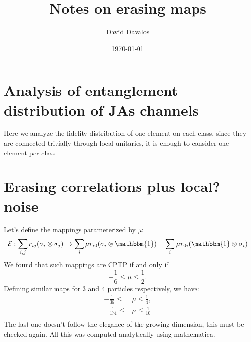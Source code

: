 \documentclass[letterpaper,12pt]{article} %
\author{David Davalos}
\date{\today}
\title{Notes on erasing maps}
\newcommand{\one}{\mathbbm{1}}
\newcommand{\<}{\langle}
\newcommand{\mcE}{\mathcal{E}}
\begin{document}
 
\maketitle
\tableofcontents
\section{Analysis of entanglement distribution of JAs channels}
Here we analyze the fidelity distribution of one element on each class, since they are connected trivially through local unitaries, it is enough to consider  one element per class.
\section{Erasing correlations plus local? noise}
Let's define the mappings parameterized by $\mu$:
\begin{equation}
\mcE:\sum_{i,j} r_{ij} (\sigma_i \otimes \sigma_j) \mapsto \sum_{i} \mu r_{i0} (\sigma_i\otimes \one) +\sum_{i} \mu r_{0i} (\one \otimes \sigma_i)
\end{equation}
We found that such mappings are CPTP if and only if
\begin{equation}
-\frac{1}{6}\leq \mu\leq \frac{1}{2}.
\end{equation}
Defining similar maps for $3$ and $4$ particles respectively, we have:
\begin{align}
-\frac{1}{36}\leq &\mu\leq \frac{1}{4},\\
-\frac{1}{174}\leq &\mu \leq \frac{1}{10}\\
\end{align}
The last one doesn't follow the elegance of the growing dimension, this must be checked again. All this was computed analytically using mathematica.
\end{document}
